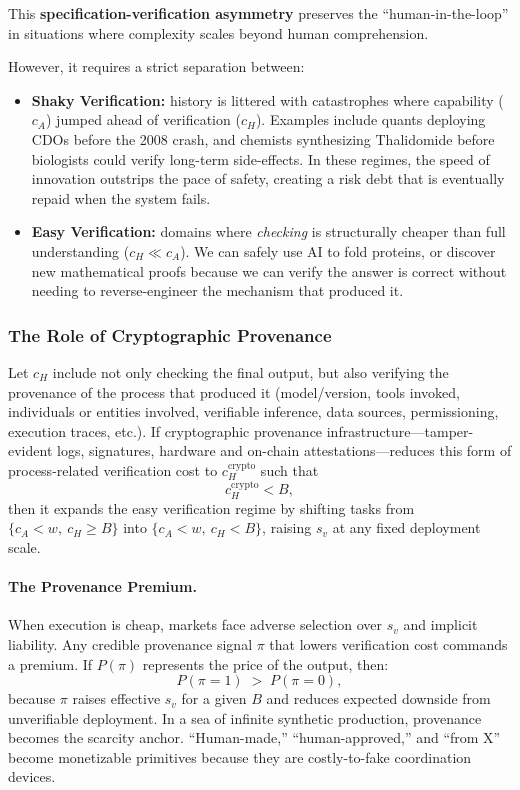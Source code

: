 \documentclass[12pt, letter]{article}
\begin{document}
This \textbf{specification-verification asymmetry} preserves the ``human-in-the-loop'' in situations where complexity scales beyond human comprehension. 

However, it requires a strict separation between:
\begin{itemize}
\item[$\blacktriangleright$] \textbf{Shaky Verification:} history is littered with catastrophes where capability ($c_A$) jumped ahead of verification ($c_H$). Examples include quants deploying CDOs before the 2008 crash, and chemists synthesizing Thalidomide before biologists could verify long-term side-effects. In these regimes, the speed of innovation outstrips the pace of safety, creating a risk debt that is eventually repaid when the system fails.

\item[$\blacktriangleright$] \textbf{Easy Verification:} domains where \emph{checking} is structurally cheaper than full understanding ($c_H \ll c_A$). We can safely use AI to fold proteins, or discover new mathematical proofs because we can verify the answer is correct without needing to reverse-engineer the mechanism that produced it.
\end{itemize}


\subsubsection{The Role of Cryptographic Provenance}\label{sec:crypto_provenance}

Let $c_H$ include not only checking the final output, but also verifying the provenance of the process that produced it (model/version, tools invoked, individuals or entities involved, verifiable inference, data sources, permissioning, execution traces, etc.). If cryptographic provenance infrastructure---tamper-evident logs, signatures, hardware and on-chain attestations---reduces this form of process-related verification cost to $c_H^{\text{crypto}}$ such that
\[
c_H^{\text{crypto}} < B,
\]
then it expands the easy verification regime by shifting tasks from $\{c_A<w,\ c_H\ge B\}$ into $\{c_A<w,\ c_H<B\}$, raising $s_v$ at any fixed deployment scale.

\paragraph{The Provenance Premium.}
When execution is cheap, markets face adverse selection over $s_v$ and implicit liability. Any credible provenance signal $\pi$ that lowers verification cost commands a premium. If $P(\pi)$ represents the price of the output, then:
\[
P(\pi=1)\;>\;P(\pi=0),
\]
because $\pi$ raises effective $s_v$ for a given $B$ and reduces expected downside from unverifiable deployment. In a sea of infinite synthetic production, provenance becomes the scarcity anchor. ``Human-made,'' ``human-approved,'' and ``from X'' become monetizable primitives because they are costly-to-fake coordination devices.
\end{document}
